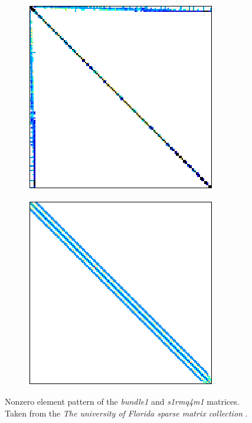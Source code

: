 \begin{figure}[ht!]
	\centering
	\begin{subfigure}{.5\textwidth}
		\centering
		\includegraphics[width=.7\textwidth, keepaspectratio, clip]{Images/ch3/matrices/bundle1.png}
		\label{Subfigure:comparing-decomposition-implementations-speedup-comparison-between-CM-and-different-ICMs-matrix-bundle1}
	\end{subfigure}%
	\begin{subfigure}{.5\textwidth}
		\centering
		\includegraphics[width=.7\textwidth, keepaspectratio, clip]{Images/ch3/matrices/s1rmq4m1.png}
		\label{Subfigure:comparing-decomposition-implementations-bandwidth-of-the-implementations-matrix-s1rmq4m1}
	\end{subfigure}
	\caption{Nonzero element pattern of the \textit{bundle1} and \textit{s1rmq4m1} matrices. Taken from the \emph{The university of Florida sparse matrix collection} \cite{Davis2011}.}
	\label{Figure:comparing-decomposition-implementations-speedup-comparison-between-CM-and-different-ICMs-matrices-bundle1-s1rmq4m1}
\end{figure}

